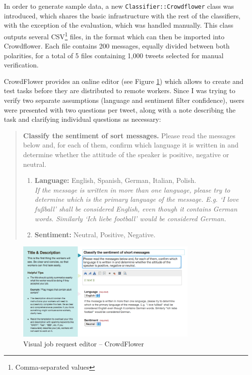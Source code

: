 In order to generate sample data, a new \verb|Classifier::Crowdflower| class was introduced, which shares the basic infrastructure with the rest of the classifiers, with the exception of the evaluation, which was handled manually. This class outputs several CSV\footnote{Comma-separated values} files, in the format which can then be imported into Crowdflower. Each file contains 200 messages, equally divided between both polarities, for a total of 5 files containing 1,000 tweets selected for manual verification.

CrowdFlower provides an online editor (see Figure \ref{fig:crowdflower-editor}) which allows to create and test tasks before they are distributed to remote workers. Since I was trying to verify two separate assumptions (language and sentiment filter confidence), users were presented with two questions per tweet, along with a note describing the task and clarifying individual questions as necessary:

\begin{quote}
  \textbf{Classify the sentiment of sort messages.} Please read the messages below and, for each of them, confirm which language it is written in and determine whether the attitude of the speaker is positive, negative or neutral.

  \begin{enumerate}
    \item \textbf{Language:} English, Spanish, German, Italian, Polish. \\ \textit{If the message is written in more than one language, please try to determine which is the primary language of the message. E.g. `I love fu{\ss}ball' shall be considered English, even though it contains German words. Similarly `Ich liebe football' would be considered German.}
    \item \textbf{Sentiment:} Neutral, Positive, Negative.
  \end{enumerate}
\end{quote}

\begin{figure}[htb]
  \begin{center}
    \includegraphics[width=0.8\textwidth]{crowdflower-editor.png}
    \caption{Visual job request editor -- CrowdFlower}
    \label{fig:crowdflower-editor}
  \end{center}
\end{figure}

